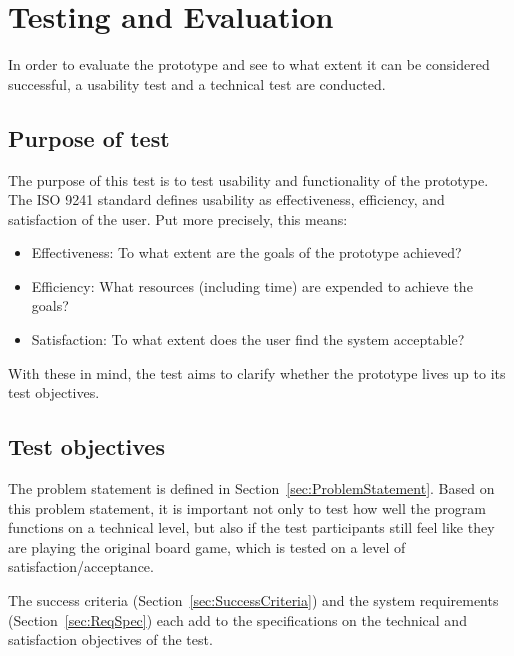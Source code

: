 \chapter{Testing and Evaluation}\label{ch:testeval}
In order to evaluate the prototype and see to what extent it can be considered successful, a usability test and a technical test are conducted.

\section{Purpose of test}
The purpose of this test is to test usability and functionality of the prototype. The ISO 9241 \citep{ISO} standard defines usability as effectiveness, efficiency, and satisfaction of the user. Put more precisely, this means:
\begin{itemize}
\item Effectiveness: To what extent are the goals of the prototype achieved?
\item Efficiency: What resources (including time) are expended to achieve the goals?
\item Satisfaction: To what extent does the user find the system acceptable?
\end{itemize}
With these in mind, the test aims to clarify whether the prototype lives up to its test objectives.

\section{Test objectives}\label{sec:TestObjectives}
The problem statement is defined in Section~\ref{sec:ProblemStatement}. Based on this problem statement, it is important not only to test how well the program functions on a technical level, but also if the test participants still feel like they are playing the original board game, which is tested on a level of satisfaction/acceptance.

The success criteria (Section~\ref{sec:SuccessCriteria}) and the system requirements (Section~\ref{sec:ReqSpec}) each add to the specifications on the technical and satisfaction  objectives of the test.

